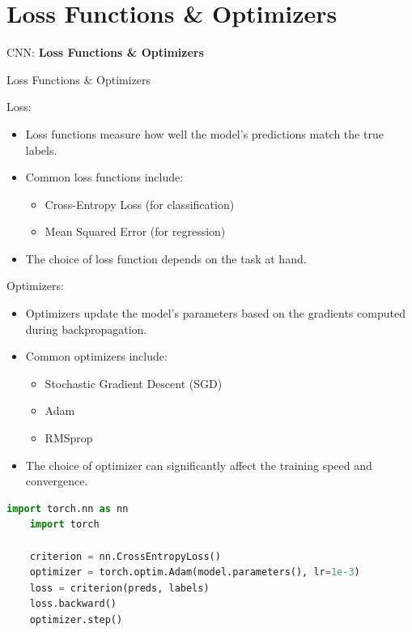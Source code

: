 \section{Loss Functions \& Optimizers}
\begin{frame}{}
    \LARGE CNN: \textbf{Loss Functions \& Optimizers}
\end{frame}

\begin{frame}{Loss Functions \& Optimizers}
    \begin{block}{Loss:}
        \begin{itemize}
            \item Loss functions measure how well the model's predictions match the true labels.
            \item Common loss functions include:
                \begin{itemize}
                    \item Cross-Entropy Loss (for classification)
                    \item Mean Squared Error (for regression)
                \end{itemize}
            \item The choice of loss function depends on the task at hand.
        \end{itemize}
    \end{block}

    \begin{block}{Optimizers:}
        \begin{itemize}
            \item Optimizers update the model's parameters based on the gradients computed during backpropagation.
            \item Common optimizers include:
                \begin{itemize}
                    \item Stochastic Gradient Descent (SGD)
                    \item Adam
                    \item RMSprop
                \end{itemize}
            \item The choice of optimizer can significantly affect the training speed and convergence.
        \end{itemize}
    \end{block}

    \begin{lstlisting}[language=Python, title={Code snippet (PyTorch)}, basicstyle=\ttfamily\footnotesize]
    import torch.nn as nn
    import torch

    criterion = nn.CrossEntropyLoss()
    optimizer = torch.optim.Adam(model.parameters(), lr=1e-3)
    loss = criterion(preds, labels)
    loss.backward()
    optimizer.step()
    \end{lstlisting}
\end{frame}  